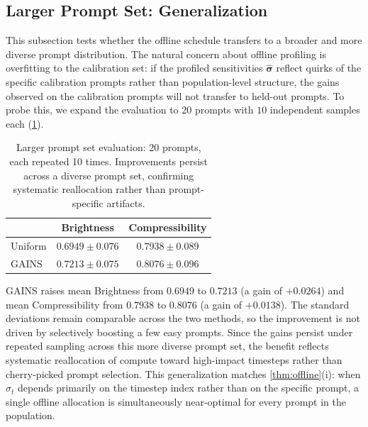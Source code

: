 \subsection{Larger Prompt Set: Generalization}
\label{sec:appendix-prompt-set}
%
This subsection tests whether the offline schedule transfers to a broader and more diverse prompt distribution. The natural concern about offline profiling is overfitting to the calibration set: if the profiled sensitivities $\hat{\boldsymbol{\sigma}}$ reflect quirks of the specific calibration prompts rather than population-level structure, the gains observed on the calibration prompts will not transfer to held-out prompts. To probe this, we expand the evaluation to $20$ prompts with $10$ independent samples each (\cref{tab:larger_prompt_exp}).

\begin{table}[h]
\centering
\caption{Larger prompt set evaluation: 20 prompts, each repeated 10 times. Improvements persist across a diverse prompt set, confirming systematic reallocation rather than prompt-specific artifacts.}
\label{tab:larger_prompt_exp}
\small
\begin{tabular}{lcc}
\toprule
& \textbf{Brightness} & \textbf{Compressibility} \\
\midrule
Uniform & $0.6949\pm0.076$ & $0.7938\pm0.089$ \\
\textsc{GAINS} & $\mathbf{0.7213\pm0.075}$ & $\mathbf{0.8076\pm0.096}$ \\
\bottomrule
\end{tabular}
\end{table}

\textsc{GAINS} raises mean Brightness from $0.6949$ to $0.7213$ (a gain of $+0.0264$) and mean Compressibility from $0.7938$ to $0.8076$ (a gain of $+0.0138$). The standard deviations remain comparable across the two methods, so the improvement is not driven by selectively boosting a few easy prompts. Since the gains persist under repeated sampling across this more diverse prompt set, the benefit reflects systematic reallocation of compute toward high-impact timesteps rather than cherry-picked prompt selection. This generalization matches \cref{thm:offline}\textup{(i)}: when $\sigma_t$ depends primarily on the timestep index rather than on the specific prompt, a single offline allocation is simultaneously near-optimal for every prompt in the population.

